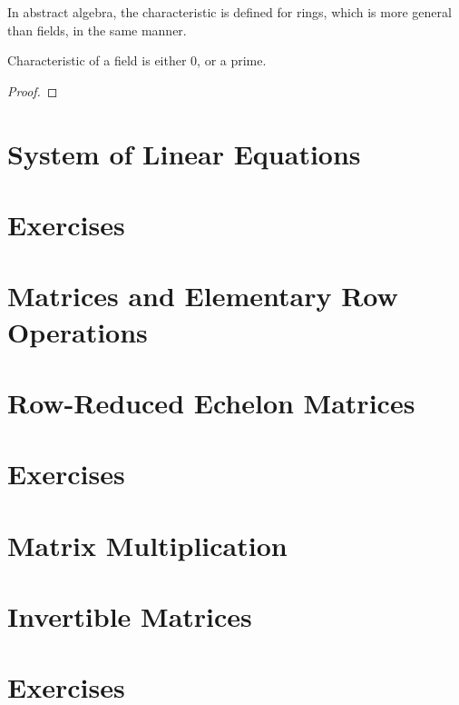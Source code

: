 \begin{note}
    In abstract algebra, the characteristic is defined for rings, which is more general than fields, in the same manner.
\end{note}

\begin{theorem}
    Characteristic of a field is either $0$, or a prime.
\end{theorem}

\begin{proof}
\end{proof}

\section{System of Linear Equations}

\section*{Exercises}

\section{Matrices and Elementary Row Operations}

\section{Row-Reduced Echelon Matrices}

\section*{Exercises}

\section{Matrix Multiplication}

\section{Invertible Matrices}

\section*{Exercises}
